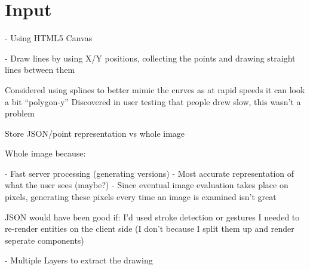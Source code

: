 \section{Input}

- Using HTML5 Canvas

- Draw lines by using X/Y positions, collecting the points and drawing straight lines between them

Considered using splines to better mimic the curves as at rapid speeds it can look a bit ``polygon-y''
Discovered in user testing that people drew slow, this wasn't a problem

Store JSON/point representation vs whole image

Whole image because:

- Fast server processing (generating versions)
- Most accurate representation of what the user sees (maybe?)
- Since eventual image evaluation takes place on pixels, generating these pixels every time an image is examined isn't great

JSON would have been good if:
I'd used stroke detection or gestures
I needed to re-render entities on the client side (I don't because I split them up and render seperate components)

- Multiple Layers to extract the drawing
